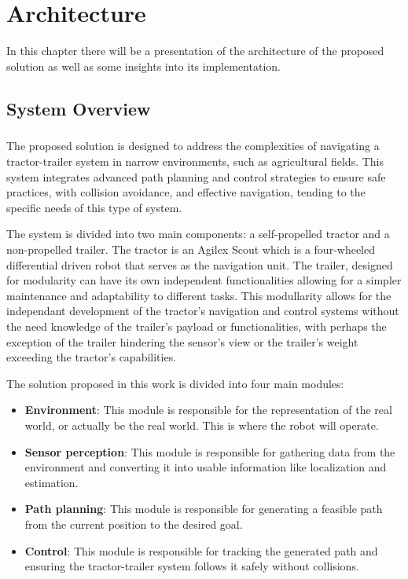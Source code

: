 
%

\chapter{Architecture}
\label{cha:architecture}

In this chapter there will be a presentation of the architecture of the proposed solution as well as some insights into its 
implementation.

\section{System Overview}
\label{sec:systemoverview}
\paragraph{}The proposed solution is designed to address the complexities of navigating a 
tractor-trailer system in narrow environments, such as agricultural fields. This system integrates 
advanced path planning and control strategies to ensure safe practices, with collision avoidance, and 
effective navigation, tending to the specific needs of this type of system.

The system is divided into two main components: a self-propelled tractor and a non-propelled trailer. 
The tractor is an Agilex Scout which is a four-wheeled differential driven robot that serves as the 
navigation unit. The trailer, designed for modularity can have its own independent functionalities 
allowing for a simpler maintenance and adaptability to different tasks. This modullarity allows 
for the independant development of the tractor's navigation and control systems without the need knowledge of the trailer's 
payload or functionalities, with perhaps the exception of the trailer hindering the sensor's view 
or the trailer's weight exceeding the tractor's capabilities.

The solution proposed in this work is divided into four main modules:
\begin{itemize}
    \item \textbf{Environment}: This module is responsible for the representation of the real world, or actually be the real world. This is where the robot will operate.
    \item \textbf{Sensor perception}: This module is responsible for gathering data from the environment and converting it into usable information like localization and estimation.
    \item \textbf{Path planning}: This module is responsible for generating a feasible path from the current position to the desired goal.
    \item \textbf{Control}: This module is responsible for tracking the generated path and ensuring the tractor-trailer system follows it safely without collisions.
\end{itemize}

